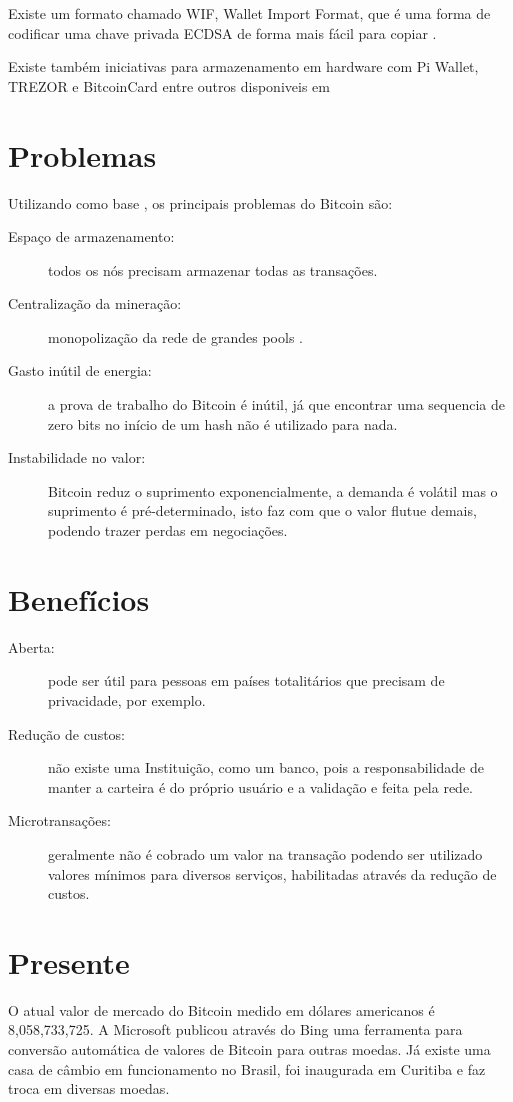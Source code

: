 \documentclass[a4paper,11pt]{article}
\theoremstyle{mytheor}
\begin{document}
Existe um formato chamado WIF, Wallet Import Format, que é uma forma de codificar uma chave privada ECDSA de forma mais fácil para copiar \cite{wif}. 

Existe também iniciativas para armazenamento em hardware com Pi Wallet, TREZOR e BitcoinCard entre outros disponiveis em \cite{hardWallet}

\section*{Problemas}
Utilizando como base \cite{hardProblems}, os principais problemas do Bitcoin são:

\begin{description}
\item[Espaço de armazenamento:] todos os nós precisam armazenar todas as transações.
\item[Centralização da mineração:] monopolização da rede de grandes pools \cite{pools}.
\item[Gasto inútil de energia:] a prova de trabalho do Bitcoin é inútil, já que encontrar uma sequencia de zero bits no início de um hash não é utilizado para nada. 

\item[Instabilidade no valor:] Bitcoin reduz o suprimento exponencialmente, a demanda é volátil mas o suprimento é pré-determinado, isto faz com que o valor flutue demais, podendo trazer perdas em negociações.
\end{description}

\section*{Benefícios}
\begin{description}
\item[Aberta:] pode ser útil para pessoas em países totalitários que precisam de privacidade, por exemplo. 
\item[Redução de custos:] não existe uma Instituição, como um banco, pois a responsabilidade de manter a carteira é do próprio usuário e a validação e feita pela rede.
\item[Microtransações:] geralmente não é cobrado um valor na transação podendo ser utilizado valores mínimos para diversos serviços, habilitadas através da redução de custos.
\end{description}

\section*{Presente}
O atual valor de mercado do Bitcoin medido em dólares americanos é 8,058,733,725.
A Microsoft publicou \cite{bing} através do Bing uma ferramenta para conversão automática de valores de Bitcoin para outras moedas. Já existe uma casa de câmbio em funcionamento no Brasil, foi inaugurada em Curitiba e faz troca em diversas moedas. 
\end{document}
